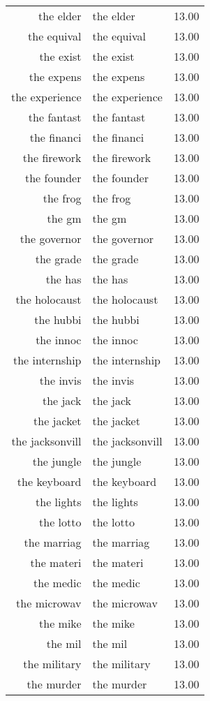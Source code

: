 \begin{table}[ht]
\begin{tabular}{rlr}
  the elder & the elder & 13.00 \\ 
  the equival & the equival & 13.00 \\ 
  the exist & the exist & 13.00 \\ 
  the expens & the expens & 13.00 \\ 
  the experience & the experience & 13.00 \\ 
  the fantast & the fantast & 13.00 \\ 
  the financi & the financi & 13.00 \\ 
  the firework & the firework & 13.00 \\ 
  the founder & the founder & 13.00 \\ 
  the frog & the frog & 13.00 \\ 
  the gm & the gm & 13.00 \\ 
  the governor & the governor & 13.00 \\ 
  the grade & the grade & 13.00 \\ 
  the has & the has & 13.00 \\ 
  the holocaust & the holocaust & 13.00 \\ 
  the hubbi & the hubbi & 13.00 \\ 
  the innoc & the innoc & 13.00 \\ 
  the internship & the internship & 13.00 \\ 
  the invis & the invis & 13.00 \\ 
  the jack & the jack & 13.00 \\ 
  the jacket & the jacket & 13.00 \\ 
  the jacksonvill & the jacksonvill & 13.00 \\ 
  the jungle & the jungle & 13.00 \\ 
  the keyboard & the keyboard & 13.00 \\ 
  the lights & the lights & 13.00 \\ 
  the lotto & the lotto & 13.00 \\ 
  the marriag & the marriag & 13.00 \\ 
  the materi & the materi & 13.00 \\ 
  the medic & the medic & 13.00 \\ 
  the microwav & the microwav & 13.00 \\ 
  the mike & the mike & 13.00 \\ 
  the mil & the mil & 13.00 \\ 
  the military & the military & 13.00 \\ 
  the murder & the murder & 13.00 \\ 

\end{tabular}
\end{table}
